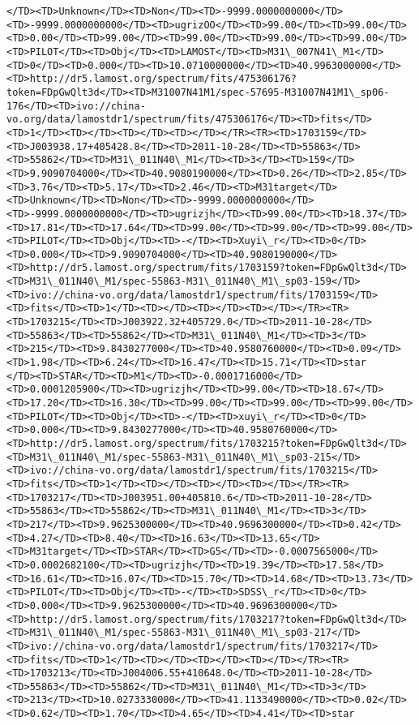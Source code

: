\documentclass[11pt]{article}
\begin{document}
\begin{Verbatim}[commandchars=\\\{\}]
</TD><TD>Unknown</TD><TD>Non</TD><TD>-9999.0000000000</TD><TD>-9999.0000000000</TD><TD>ugrizOO</TD><TD>99.00</TD><TD>99.00</TD><TD>0.00</TD><TD>99.00</TD><TD>99.00</TD><TD>99.00</TD><TD>99.00</TD><TD>PILOT</TD><TD>Obj</TD><TD>LAMOST</TD><TD>M31\_007N41\_M1</TD><TD>0</TD><TD>0.000</TD><TD>10.0710000000</TD><TD>40.9963000000</TD><TD>http://dr5.lamost.org/spectrum/fits/475306176?token=FDpGwQlt3d</TD><TD>M31007N41M1/spec-57695-M31007N41M1\_sp06-176</TD><TD>ivo://china-vo.org/data/lamostdr1/spectrum/fits/475306176</TD><TD>fits</TD><TD>1</TD><TD></TD><TD></TD><TD></TD></TR><TR><TD>1703159</TD><TD>J003938.17+405428.8</TD><TD>2011-10-28</TD><TD>55863</TD><TD>55862</TD><TD>M31\_011N40\_M1</TD><TD>3</TD><TD>159</TD><TD>9.9090704000</TD><TD>40.9080190000</TD><TD>0.26</TD><TD>2.85</TD><TD>3.76</TD><TD>5.17</TD><TD>2.46</TD><TD>M31target</TD><TD>Unknown</TD><TD>Non</TD><TD>-9999.0000000000</TD><TD>-9999.0000000000</TD><TD>ugrizjh</TD><TD>99.00</TD><TD>18.37</TD><TD>17.81</TD><TD>17.64</TD><TD>99.00</TD><TD>99.00</TD><TD>99.00</TD><TD>PILOT</TD><TD>Obj</TD><TD>-</TD><TD>Xuyi\_r</TD><TD>0</TD><TD>0.000</TD><TD>9.9090704000</TD><TD>40.9080190000</TD><TD>http://dr5.lamost.org/spectrum/fits/1703159?token=FDpGwQlt3d</TD><TD>M31\_011N40\_M1/spec-55863-M31\_011N40\_M1\_sp03-159</TD><TD>ivo://china-vo.org/data/lamostdr1/spectrum/fits/1703159</TD><TD>fits</TD><TD>1</TD><TD></TD><TD></TD><TD></TD></TR><TR><TD>1703215</TD><TD>J003922.32+405729.0</TD><TD>2011-10-28</TD><TD>55863</TD><TD>55862</TD><TD>M31\_011N40\_M1</TD><TD>3</TD><TD>215</TD><TD>9.8430277000</TD><TD>40.9580760000</TD><TD>0.09</TD><TD>1.98</TD><TD>6.24</TD><TD>16.47</TD><TD>15.71</TD><TD>star     </TD><TD>STAR</TD><TD>M1</TD><TD>-0.0001716000</TD><TD>0.0001205900</TD><TD>ugrizjh</TD><TD>99.00</TD><TD>18.67</TD><TD>17.20</TD><TD>16.30</TD><TD>99.00</TD><TD>99.00</TD><TD>99.00</TD><TD>PILOT</TD><TD>Obj</TD><TD>-</TD><TD>xuyi\_r</TD><TD>0</TD><TD>0.000</TD><TD>9.8430277000</TD><TD>40.9580760000</TD><TD>http://dr5.lamost.org/spectrum/fits/1703215?token=FDpGwQlt3d</TD><TD>M31\_011N40\_M1/spec-55863-M31\_011N40\_M1\_sp03-215</TD><TD>ivo://china-vo.org/data/lamostdr1/spectrum/fits/1703215</TD><TD>fits</TD><TD>1</TD><TD></TD><TD></TD><TD></TD></TR><TR><TD>1703217</TD><TD>J003951.00+405810.6</TD><TD>2011-10-28</TD><TD>55863</TD><TD>55862</TD><TD>M31\_011N40\_M1</TD><TD>3</TD><TD>217</TD><TD>9.9625300000</TD><TD>40.9696300000</TD><TD>0.42</TD><TD>4.27</TD><TD>8.40</TD><TD>16.63</TD><TD>13.65</TD><TD>M31target</TD><TD>STAR</TD><TD>G5</TD><TD>-0.0007565000</TD><TD>0.0002682100</TD><TD>ugrizjh</TD><TD>19.39</TD><TD>17.58</TD><TD>16.61</TD><TD>16.07</TD><TD>15.70</TD><TD>14.68</TD><TD>13.73</TD><TD>PILOT</TD><TD>Obj</TD><TD>-</TD><TD>SDSS\_r</TD><TD>0</TD><TD>0.000</TD><TD>9.9625300000</TD><TD>40.9696300000</TD><TD>http://dr5.lamost.org/spectrum/fits/1703217?token=FDpGwQlt3d</TD><TD>M31\_011N40\_M1/spec-55863-M31\_011N40\_M1\_sp03-217</TD><TD>ivo://china-vo.org/data/lamostdr1/spectrum/fits/1703217</TD><TD>fits</TD><TD>1</TD><TD></TD><TD></TD><TD></TD></TR><TR><TD>1703213</TD><TD>J004006.55+410648.0</TD><TD>2011-10-28</TD><TD>55863</TD><TD>55862</TD><TD>M31\_011N40\_M1</TD><TD>3</TD><TD>213</TD><TD>10.0273330000</TD><TD>41.1133490000</TD><TD>0.02</TD><TD>0.62</TD><TD>1.70</TD><TD>4.65</TD><TD>4.41</TD><TD>star   
\end{Verbatim}
\end{document}
